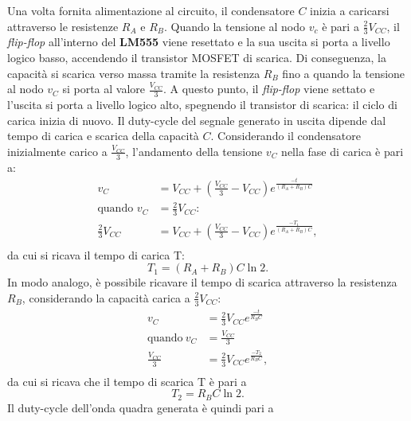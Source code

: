 \noindent
Una volta fornita alimentazione al circuito, il condensatore $C$ inizia a caricarsi attraverso le resistenze $R_A$ e $R_B$. Quando la tensione al nodo $v_c$ è pari a $\frac{2}{3}V_{CC}$, il \textit{flip-flop} all'interno del \textbf{LM555} viene resettato e la sua uscita si porta a livello logico basso, accendendo il transistor MOSFET di scarica. Di conseguenza, la capacità si scarica verso massa tramite la resistenza $R_B$ fino a quando la tensione al nodo $v_C$ si porta al valore $\frac{V_{CC}}{3}$. A questo punto, il \textit{flip-flop} viene settato e l'uscita si porta a livello logico alto, spegnendo il transistor di scarica: il ciclo di carica inizia di nuovo. Il duty-cycle del segnale generato in uscita dipende dal tempo di carica e scarica della capacità $C$. Considerando il condensatore inizialmente carico a $\frac{V_{CC}}{3}$, l'andamento della tensione $v_C$ nella fase di carica è pari a:
\begin{equation}
	\begin{split}
		v_C&=V_{CC}+\left(\frac{V_{CC}}{3}-V_{CC}\right)e^{\frac{-t}{\left(R_A+R_B\right)C}} \\
		\text{quando }v_C&=\frac{2}{3}V_{CC}\text{:} \\
		\frac{2}{3}V_{CC}&=V_{CC}+\left(\frac{V_{CC}}{3}-V_{CC}\right)e^{\frac{-T_1}{\left(R_A+R_B\right)C}}, \\
	\end{split}
\end{equation}
da cui si ricava il tempo di carica T:
\begin{equation}
	T_{1}=(R_A+R_B)C\ln{2}.
	\label{eq:t1}
\end{equation}
In modo analogo, è possibile ricavare il tempo di scarica attraverso la resistenza $R_B$, considerando la capacità carica a $\frac{2}{3}V_{CC}$:
\begin{equation}
	\begin{split}
		v_C&=\frac{2}{3}V_{CC}e^{\frac{-t}{R_BC}} \\
		\text{quando} \ v_C&=\frac{V_{CC}}{3} \\
		\frac{V_{CC}}{3}&=\frac{2}{3}V_{CC}e^{\frac{-T_2}{R_BC}}, \\
	\end{split}
\end{equation}
da cui si ricava che il tempo di scarica T è pari a
\begin{equation}
	T_2=R_B C \ln{2}.
	\label{eq:t2}
\end{equation}
Il duty-cycle dell'onda quadra generata è quindi pari a 
